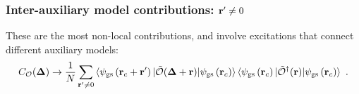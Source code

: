 \documentclass[reprint,hidelinks,onecolumn]{revtex4-2}
\begin{document}
\subsubsection{Inter-auxiliary model contributions: \({\bf r}^\prime \neq 0\)}
These are the most non-local contributions, and involve excitations that connect different auxiliary models:
\begin{equation}\begin{aligned}
	C_{\mathcal{O}}({\bf \Delta}) \to \frac{1}{N}\sum_{{\bf r}^\prime \neq 0}\braket{\psi_\text{gs}\left({\bf r}_c + {\bf r}^\prime\right) | \mathcal{\tilde O}({\bf \Delta} + {\bf r}) | \psi_\text{gs}\left({\bf r}_c\right)}\braket{\psi_\text{gs}\left({\bf r}_c\right) | \mathcal{\tilde O}^\dagger({\bf r}) | \psi_\text{gs}\left({\bf r}_c\right)}~.
\end{aligned}\end{equation}
\end{document}
